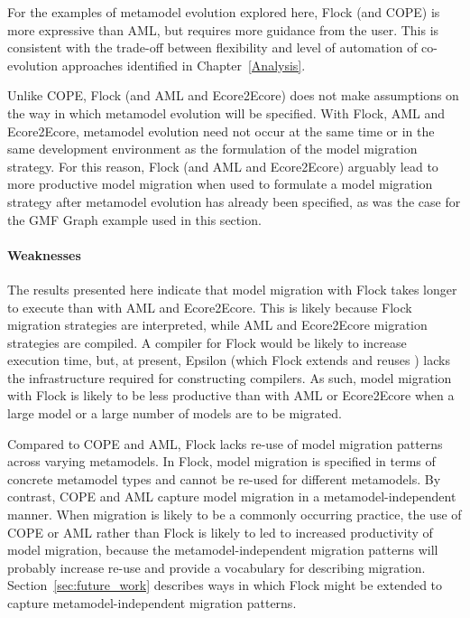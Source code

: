 For the examples of metamodel evolution explored here, Flock (and COPE) is more expressive than AML, but requires more guidance from the user. This is consistent with the trade-off between flexibility and level of automation of co-evolution approaches identified in Chapter~\ref{Analysis}.

Unlike COPE, Flock (and AML and Ecore2Ecore) does not make assumptions on the way in which metamodel evolution will be specified. With Flock, AML and Ecore2Ecore, metamodel evolution need not occur at the same time or in the same development environment as the formulation of the model migration strategy. For this reason, Flock (and AML and Ecore2Ecore) arguably lead to more productive model migration when used to formulate a model migration strategy after metamodel evolution has already been specified, as was the case for the GMF Graph example used in this section.

\paragraph{Weaknesses} The results presented here indicate that model migration with Flock takes longer to execute than with AML and Ecore2Ecore. This is likely because Flock migration strategies are interpreted, while AML and Ecore2Ecore migration strategies are compiled. A compiler for Flock would be likely to increase execution time, but, at present, Epsilon (which Flock extends and reuses ) lacks the infrastructure required for constructing compilers. As such, model migration with Flock is likely to be less productive than with AML or Ecore2Ecore when a large model or a large number of models are to be migrated.

Compared to COPE and AML, Flock lacks re-use of model migration patterns across varying metamodels. In Flock, model migration is specified in terms of concrete metamodel types and cannot be re-used for different metamodels. By contrast, COPE and AML capture model migration in a metamodel-independent manner. When migration is likely to be a commonly occurring practice, the use of COPE or AML rather than Flock is likely to led to increased productivity of model migration, because the metamodel-independent migration patterns will probably increase re-use and provide a vocabulary for describing migration. Section~\ref{sec:future_work} describes ways in which Flock might be extended to capture metamodel-independent migration patterns.

